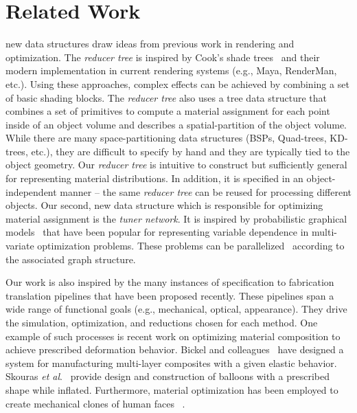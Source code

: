 \chapter{Related Work}
\label{chap:relate}
 new data structures draw ideas from previous work in rendering and optimization.
The \emph{reducer tree} is inspired by Cook's shade trees~\cite{Cook1984} and their modern implementation in current rendering systems (e.g., Maya, RenderMan, etc.). Using these approaches, complex effects can be achieved by combining a set of basic shading blocks. The \emph{reducer tree} also uses a tree data structure that combines a set of primitives to compute a material assignment for each point inside of an object volume and describes a spatial-partition of the object volume. While there are many space-partitioning data structures (BSPs, Quad-trees, KD-trees, etc.), they are difficult to specify by hand and they are typically tied to the object geometry. Our \emph{reducer tree} is intuitive to construct but sufficiently general for representing material distributions. In addition, it is specified in an object-independent manner -- the same \emph{reducer tree} can be reused for processing different objects. Our second, new data structure which is responsible for optimizing material assignment is the \emph{tuner network}. It is inspired by probabilistic graphical models~\cite{Jordan:1999} that have been popular for representing variable dependence in multi-variate optimization problems. These problems can be parallelized~\cite{GraphLab} according to the associated graph structure.

Our work is also inspired by the many instances of specification to fabrication translation pipelines that have been proposed recently. These pipelines span a wide range of functional goals (e.g., mechanical, optical, appearance). They drive the simulation, optimization, and reductions chosen for each method. 
One example of such processes is recent work on optimizing material composition to achieve prescribed deformation behavior. 
Bickel and colleagues~ have designed a system for manufacturing multi-layer composites with a given elastic behavior.
 Skouras \textit{et al}.~ provide design and construction of balloons with a prescribed shape while inflated. Furthermore, material optimization has been employed to create mechanical clones of human faces ~\cite{Bickel:2012}.

